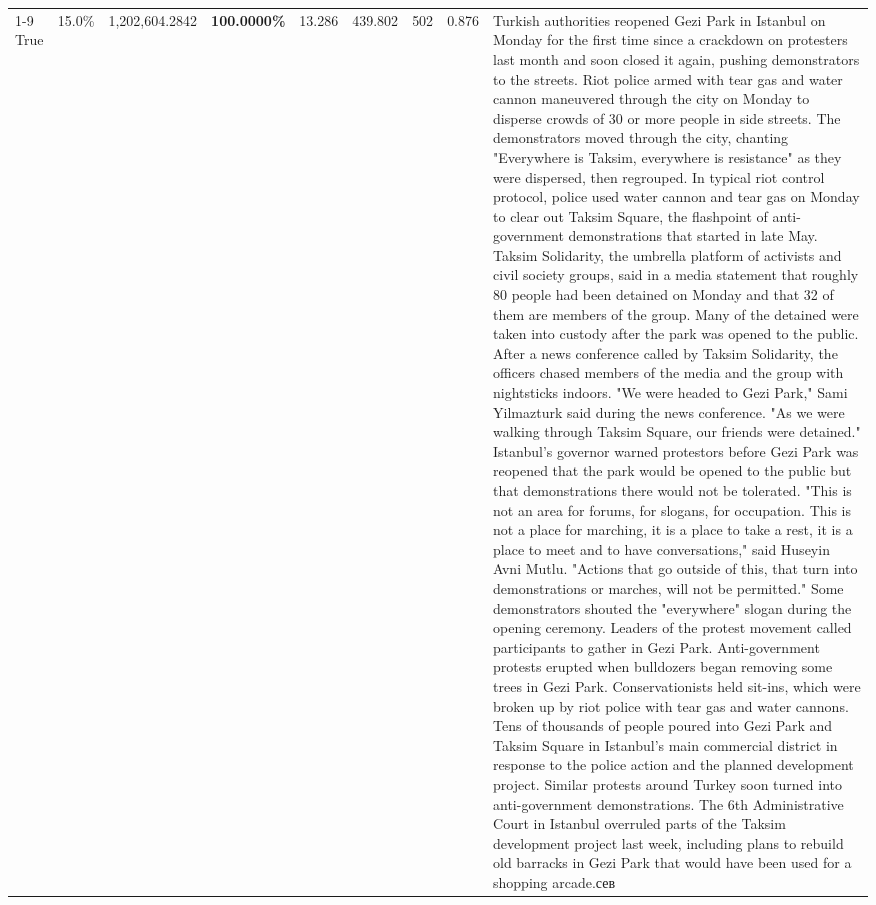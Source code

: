 \begin{table}[H]
\begin{tabular}{lllrlllll}
\cline{1-9}
True & 15.0\% & 1,202,604.2842 & \bfseries \color{red} 100.0000\% & 13.286 & 439.802 & 502 & 0.876 & Turkish authorities reopened Gezi Park in Istanbul on Monday for the first time since a crackdown on protesters last month and soon closed it again, pushing demonstrators to the streets. Riot police armed with tear gas and water cannon maneuvered through the city on Monday to disperse crowds of 30 or more people in side streets. The demonstrators moved through the city, chanting "Everywhere is Taksim, everywhere is resistance" as they were dispersed, then regrouped. In typical riot control protocol, police used water cannon and tear gas on Monday to clear out Taksim Square, the flashpoint of anti-government demonstrations that started in late May. Taksim Solidarity, the umbrella platform of activists and civil society groups, said in a media statement that roughly 80 people had been detained on Monday and that 32 of them are members of the group. Many of the detained were taken into custody after the park was opened to the public. After a news conference called by Taksim Solidarity, the officers chased members of the media and the group with nightsticks indoors. "We were headed to Gezi Park," Sami Yilmazturk said during the news conference. "As we were walking through Taksim Square, our friends were detained." Istanbul's governor warned protestors before Gezi Park was reopened that the park would be opened to the public but that demonstrations there would not be tolerated. "This is not an area for forums, for slogans, for occupation. This is not a place for marching, it is a place to take a rest, it is a place to meet and to have conversations," said Huseyin Avni Mutlu. "Actions that go outside of this, that turn into demonstrations or marches, will not be permitted." Some demonstrators shouted the "everywhere" slogan during the opening ceremony. Leaders of the protest movement called participants to gather in Gezi Park. Anti-government protests erupted when bulldozers began removing some trees in Gezi Park. Conservationists held sit-ins, which were broken up by riot police with tear gas and water cannons. Tens of thousands of people poured into Gezi Park and Taksim Square in Istanbul's main commercial district in response to the police action and the planned development project. Similar protests around Turkey soon turned into anti-government demonstrations. The 6th Administrative Court in Istanbul overruled parts of the Taksim development project last week, including plans to rebuild old barracks in Gezi Park that would have been used for a shopping arcade.сев \\

\end{tabular}
\end{table}
